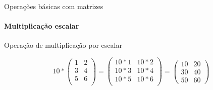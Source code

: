 \begin{frame}[t]{Operações básicas com matrizes} 
    \framesubtitle{Multiplicação escalar}

    Operação de multiplicação por escalar

    \vspace*{0.8cm}

    \begin{equation}
        10
        *
        \begin{pmatrix}
            1 & 2 \\
            3 & 4 \\
            5 & 6 \\
        \end{pmatrix}
        =
        \begin{pmatrix}
            10 * 1  & 10 * 2  \\
            10 * 3  & 10 * 4  \\
            10 * 5  & 10 * 6  \\
        \end{pmatrix}
        =
        \begin{pmatrix}
            10  & 20 \\
            30  & 40\\
            50  & 60 
        \end{pmatrix}
    \end{equation}
    \vspace*{0.3cm}
\end{frame}
